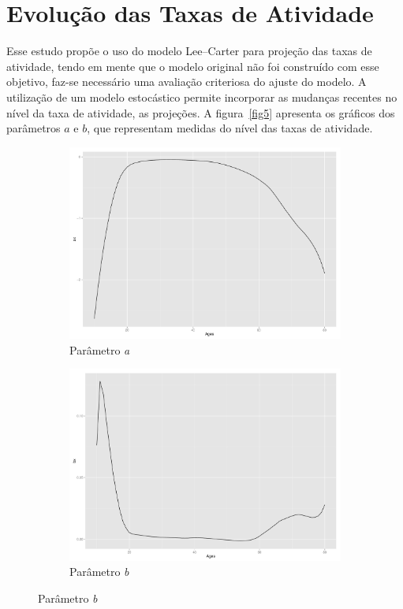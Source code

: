 \documentclass[12pt, 						%
			openright, 					%
			twoside,					%
			a4paper,x					%
			english,					%
			brazil]{abntex2}				%
\begin{document}
	\section{Evolução das Taxas de Atividade \label{sec4.2}}
	Esse estudo propõe o uso do modelo Lee--Carter para projeção das taxas de atividade, tendo em mente que o modelo original não foi construído com esse objetivo, faz-se necessário uma avaliação criteriosa do ajuste do modelo. A utilização de um modelo estocástico permite incorporar as mudanças recentes no nível da taxa de atividade, as projeções. A figura~\ref{fig5} apresenta os gráficos dos parâmetros $a$ e $b$, que representam medidas do nível das taxas de atividade. \\
	 \begin{figure}[!htb]
	\caption{\label{fig5} Parâmetros \textit{a} e \textit{b} do modelo Lee--Carter}
		\begin{subfigure}[b]{0.5\textwidth}
		\begin{center}
			\caption{\label{fig5.1} Parâmetro \textit{a}}
			\includegraphics[width=\textwidth]{Graphs/LFPR_LC_ax.pdf}
		\end{center}
		\end{subfigure}
	\hfill
		\begin{subfigure}[b]{0.5\textwidth}
		\begin{center}
			\caption{\label{fig5.2} Parâmetro \textit{b}}
			\includegraphics[width=\textwidth]{Graphs/LFPR_LC_bx.pdf}

\end{center}
\end{subfigure}
\end{figure}
\end{document}

